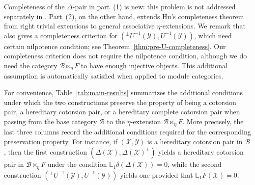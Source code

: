 \documentclass[11pt,reqno]{amsart}
\numberwithin{equation}{section}
\newcommand{\cB}{\mathcal B}
\newcommand{\cX}{\mathcal X}
\newcommand{\cY}{\mathcal Y}
\begin{document}
Completeness of the $\Delta$-pair in part~(1) is new: this problem is not addressed separately in \cite{Hu}. Part~(2), on the other hand, extends Hu's completeness theorem \cite[Theorem~3.13]{Hu} from right trivial extensions to general associative $\eta$-extensions. We remark that \cite{LG} also gives a completeness criterion for $({}^\perp U^{-1}(\cY),U^{-1}(\cY))$, which need certain nilpotence condition; see Theorem~\ref{thm:pre-U-completeness}. Our completeness criterion does not require the nilpotence condition, although we do need the category
$\cB\ltimes_\eta F$ to have enough injective objects. This additional assumption is automatically satisfied when applied to module categories.


For convenience, Table~\ref{tab:main-results} summarizes the additional conditions under which the two constructions preserve the property of being a cotorsion pair, a hereditary cotorsion pair, or a hereditary complete cotorsion pair when passing from the base category $\cB$ to the $\eta$-extension
$\cB\ltimes_\eta F$.
More precisely, the last three columns record the additional conditions required for the corresponding preservation property.
For instance, if $(\mathcal X,\mathcal Y)$ is a hereditary cotorsion pair in
$\mathcal B$, then the first construction $(\Delta(\mathcal X),\Delta(\mathcal X)^\perp)$ yields a hereditary
cotorsion pair in $\cB\ltimes_\eta F$ under the condition $\mathbb L_1\delta(\Delta(\cX))=0$, while the second
construction
$({}^\perp U^{-1}(\cY),U^{-1}(\cY))$ yields one provided
that $\mathbb L_1F(\cX)=0$.
\end{document}
